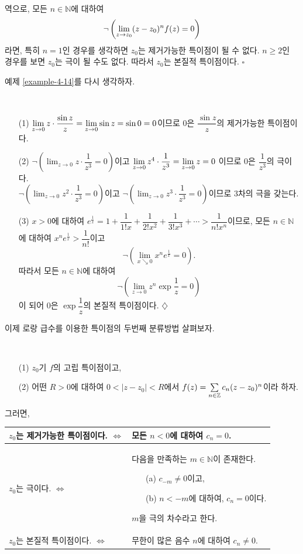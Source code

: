 역으로, 모든 $n\in\mathbb N$에 대하여
\[
 \neg\left( \lim\limits_{z\to z_0} (z-z_0)^{n} f(z) = 0 \right)
\]
라면, 특히 $n=1$인 경우를 생각하면 $z_0$는 제거가능한 특이점이 될 수 없다.
$n\ge2$인 경우를 보면 $z_0$는 극이 될 수도 없다.
따라서 $z_0$는 본질적 특이점이다. \hfill $\square$

예제 \ref{example-4-14}를 다시 생각하자.

\begin{salt_example}\label{example-4-15}
\
\begin{itemize}
\item[(1)] $\lim\limits_{z\to0} z \cdot \displaystyle\frac{\sin z}z = \lim\limits_{z\to0} \sin z 
= \sin 0 = 0$이므로 $0$은 $\dfrac{\sin z}z$의 제거가능한 특이점이다.
\item[(2)] $\neg\left(\lim_{z\to 0} z\cdot \dfrac1{z^3} = 0 \right)$이고
$\lim\limits_{z\to 0} z^4 \cdot \displaystyle\frac1{z^3} = \lim\limits_{z\to0} z = 0$ 이므로
$0$은 $\dfrac1{z^3}$의 극이다. \\
$\neg\left(\lim_{z\to 0} z^2\cdot \dfrac1{z^3} = 0 \right)$이고
$\neg\left(\lim_{z\to 0} z^3\cdot \dfrac1{z^3} = 0 \right)$이므로
$3$차의 극을 갖는다.
\item[(3)] $x>0$에 대하여
$e^{\frac1x} = 1 + \dfrac1{1!x} + \dfrac1{2!x^2} + \dfrac1{3!x^3} + \cdots
> \dfrac1{n!x^n}$이므로,
모든 $n\in\mathbb N$에 대하여 $x^ne^{\frac1x} > \dfrac1{n!}$이고
\[
\neg\left(\lim_{x\searrow 0} x^ne^{\frac1x} = 0 \right). 
\]
따라서  모든 $n\in\mathbb N$에 대하여
\[
\neg\left(\lim_{z\to 0} z^n\exp \frac1z = 0 \right)
\]
이 되어 $0$은 $\exp \dfrac 1z$의 본질적 특이점이다. 
\hfill $\diamondsuit$
\end{itemize}

이제 로랑 급수를 이용한 특이점의 두번째 분류방법 살펴보자.
\end{salt_example}

\begin{salt_theorem}[로랑 급수의 계수를 이용한 분류법] \label{thm-4-9}
\
\begin{itemize}
\item[(1)] $z_0$기 $f$의 고립 특이점이고,
\item[(2)] 어떤 $R>0$에 대하여 $0<|z-z_0|<R$에서
$f(z)= \sum\limits_{n\in\mathbb Z} c_n(z-z_0)^n$이라 하자.
\end{itemize}
그러면,
\begin{center}
\begin{tabular}{ |p{6cm}|p{6.5cm}| } 
 \hline
$z_0$는 제거가능한 특이점이다. \hfill $\Leftrightarrow$ 
& 모든 $n<0$에 대하여 $c_n=0$. \\ \hline 
$z_0$는 극이다. \hfill $\Leftrightarrow$ 
& 다음을 만족하는 $m\in\mathbb N$이 존재한다.
\begin{itemize}
\item[(a)]  $c_{-m} \ne 0$이고,
\item[(b)] $n<-m$에 대하여, $c_n=0$이다.
\end{itemize}
$m$을 극의 차수라고 한다. \\ \hline
$z_0$는 본질적 특이점이다. \hfill $\Leftrightarrow$ 
& 무한이 많은 음수  $n$에 대하여 $c_n\ne0$. \\ 
 \hline
\end{tabular}
\end{center}
\end{salt_theorem}


